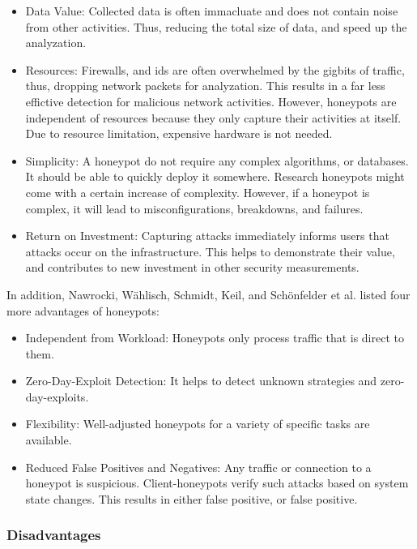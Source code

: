 \begin{itemize}
    \item Data Value: Collected data is often immacluate and does not contain noise from other activities. Thus, reducing the total size of data, and speed up the analyzation.
    \item Resources: Firewalls, and \ac{ids} are often overwhelmed by the gigbits of traffic, thus, dropping network packets for analyzation. This results in a far less effictive detection for malicious network activities. However, honeypots are independent of resources because they only capture their activities at itself. Due to resource limitation, expensive hardware is not needed. 
    \item Simplicity: A honeypot do not require any complex algorithms, or databases. It should be able to quickly deploy it somewhere. Research honeypots might come with a certain increase of complexity. However, if a honeypot is complex, it will lead to misconfigurations, breakdowns, and failures. 
    \item Return on Investment: Capturing attacks immediately informs users that attacks occur on the infrastructure. This helps to demonstrate their value, and contributes to new investment in other security measurements. 
\end{itemize}

In addition, Nawrocki, Wählisch, Schmidt, Keil, and Schönfelder et al. \cite{NawrockiWSKS2016} listed four more advantages of honeypots:

\begin{itemize}
    \item Independent from Workload: Honeypots only process traffic that is direct to them.
    \item Zero-Day-Exploit Detection: It helps to detect unknown strategies and zero-day-exploits.
    \item Flexibility: Well-adjusted honeypots for a variety of specific tasks are available.
    \item Reduced False Positives and Negatives: Any traffic or connection to a honeypot is suspicious. Client-honeypots verify such attacks based on system state changes. This results in either false positive, or false positive.
\end{itemize}

\subsubsection{Disadvantages}

